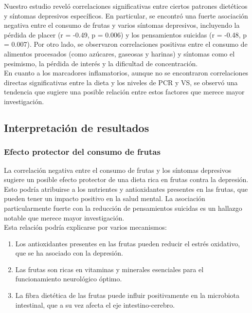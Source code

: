 \documentclass[jou]{apa7}
\begin{document}
	Nuestro estudio reveló correlaciones significativas entre ciertos
	patrones dietéticos y síntomas depresivos específicos. En particular, se
	encontró una fuerte asociación negativa entre el consumo de frutas y
	varios síntomas depresivos, incluyendo la pérdida de placer (r = -0.49,
	p = 0.006) y los pensamientos suicidas (r = -0.48, p = 0.007). Por otro
	lado, se observaron correlaciones positivas entre el consumo de
	alimentos procesados (como azúcares, gaseosas y harinas) y síntomas como
	el pesimismo, la pérdida de interés y la dificultad de concentración.\\
	
	En cuanto a los marcadores inflamatorios, aunque no se encontraron
	correlaciones directas significativas entre la dieta y los niveles de
	PCR y VS, se observó una tendencia que sugiere una posible relación
	entre estos factores que merece mayor investigación.
	
	\subsection{}\label{section}
	
	\subsection{Interpretación de resultados}\label{interpretaciuxf3n-de-resultados}
	
	\subsubsection{Efecto protector del consumo de
		frutas}
	
	La correlación negativa entre el consumo de frutas y los síntomas
	depresivos sugiere un posible efecto protector de una dieta rica en
	frutas contra la depresión. Esto podría atribuirse a los nutrientes y
	antioxidantes presentes en las frutas, que pueden tener un impacto
	positivo en la salud mental. La asociación particularmente fuerte con la
	reducción de pensamientos suicidas es un hallazgo notable que merece
	mayor investigación.\\
	
	Esta relación podría explicarse por varios mecanismos:
	
	\begin{enumerate}
		\item Los antioxidantes presentes en las frutas pueden reducir el estrés
		oxidativo, que se ha asociado con la depresión.\\
		
		\item Las frutas son ricas en vitaminas y minerales esenciales para el
		funcionamiento neurológico óptimo.\\
		
		\item La fibra dietética de las frutas puede influir positivamente en la
		microbiota intestinal, que a su vez afecta el eje intestino-cerebro.
	\end{enumerate}
	
\end{document}
